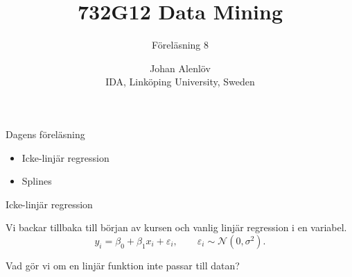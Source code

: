 \documentclass[10pt,english]{beamer}
\title{732G12 Data Mining}
\subtitle{Föreläsning 8}
\date{}
\author{Johan Alenlöv \\ IDA, Linköping University, Sweden}
\begin{document}
\maketitle

\begin{frame}{Dagens föreläsning}

    \begin{itemize}
        \item Icke-linjär regression
        \item Splines
    \end{itemize}
    
\end{frame}

\begin{frame}{Icke-linjär regression}

    Vi backar tillbaka till början av kursen och vanlig linjär regression i en variabel.
    \begin{equation*}
        y_i = \beta_0 + \beta_1 x_i + \varepsilon_i, \qquad \varepsilon_i \sim \mathcal{N}(0, \sigma^2).
    \end{equation*}

    Vad gör vi om en linjär funktion inte passar till datan?

    
\end{frame}
\end{document}
